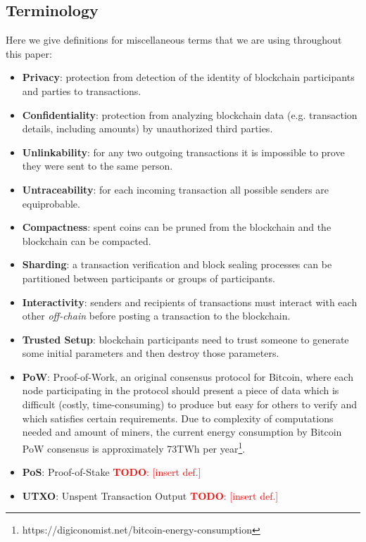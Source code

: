 \documentclass[a4paper, 10pt, conference]{ieeeconf}
\newcommand\todo[1]{\textcolor{red}{\textbf{TODO}: [#1]}}
\begin{document}
\subsection{Terminology}
Here we give definitions for miscellaneous terms that we are using throughout this paper:

\begin{itemize}
	\item \textbf{Privacy}: protection from detection of the identity of blockchain participants and parties to transactions.
	\item \textbf{Confidentiality}: protection from analyzing blockchain data (e.g. transaction details, including amounts) by unauthorized third parties.
	\item \textbf{Unlinkability}: for any two outgoing transactions it is impossible to prove they were sent to the same person\cite{c2}.
	\item \textbf{Untraceability}: for each incoming transaction all possible senders are equiprobable\cite{c2}.
	\item \textbf{Compactness}: spent coins can be pruned from the blockchain and the blockchain can be compacted.
	\item \textbf{Sharding}: a transaction verification and block sealing processes can be partitioned between participants or groups of participants.
	\item \textbf{Interactivity}: senders and recipients of transactions must interact with each other \textit{off-chain} before posting a transaction to the blockchain.
	\item \textbf{Trusted Setup}: blockchain participants need to trust someone to generate some initial parameters and then destroy those parameters.
	\item \textbf{PoW}: Proof-of-Work, an original consensus protocol for Bitcoin, where each node participating in the protocol should present a piece of data which is difficult (costly, time-consuming) to produce but easy for others to verify and which satisfies certain requirements. Due to complexity of computations needed and amount of miners, the current energy consumption by Bitcoin PoW consensus is approximately 73TWh per year\footnote{https://digiconomist.net/bitcoin-energy-consumption}.
	\item \textbf{PoS}: Proof-of-Stake \todo{insert def.}
	\item \textbf{UTXO}: Unspent Transaction Output \todo{insert def.}
\end{itemize}
\end{document}
